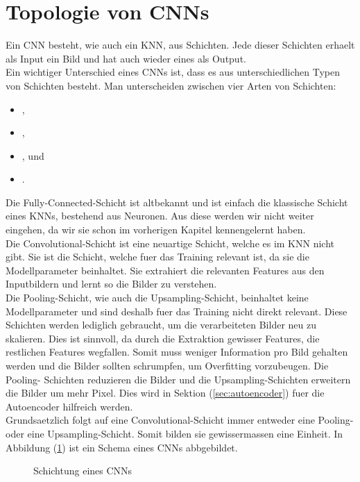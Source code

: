 \section{Topologie von CNNs}
Ein CNN besteht, wie auch ein KNN, aus Schichten. Jede dieser Schichten erhaelt
als Input ein Bild und hat auch wieder eines als Output. \\
Ein wichtiger Unterschied eines CNNs ist, dass es aus unterschiedlichen Typen von
Schichten besteht. Man unterscheiden zwischen vier Arten von Schichten:
\begin{itemize}
\item{,}
\item{,}
\item{, und}
\item{.}
\end{itemize}
Die Fully-Connected-Schicht ist altbekannt und ist einfach die klassische Schicht
eines KNNs, bestehend aus Neuronen. Aus diese werden wir nicht weiter eingehen,
da wir sie schon im vorherigen Kapitel kennengelernt haben. \\
Die Convolutional-Schicht ist eine neuartige Schicht, welche es im KNN nicht
gibt. Sie ist die Schicht, welche fuer das Training relevant ist,
da sie die Modellparameter beinhaltet. Sie extrahiert die relevanten Features
aus den Inputbildern und lernt so die Bilder zu verstehen. \\
Die Pooling-Schicht, wie auch die Upsampling-Schicht, beinhaltet keine
Modellparameter und sind deshalb fuer das Training nicht direkt relevant.
Diese Schichten werden lediglich gebraucht, um die verarbeiteten Bilder neu zu
skalieren. Dies ist sinnvoll, da durch die Extraktion gewisser Features, die
restlichen Features wegfallen. Somit muss weniger Information pro Bild gehalten
werden und die Bilder sollten schrumpfen, um Overfitting vorzubeugen. Die Pooling-
Schichten reduzieren die Bilder und die Upsampling-Schichten erweitern die
Bilder um mehr Pixel. Dies wird in Sektion (\ref{sec:autoencoder}) fuer die Autoencoder
hilfreich werden. \\
Grundsaetzlich folgt auf eine Convolutional-Schicht immer entweder eine Pooling-
oder eine Upsampling-Schicht. Somit bilden sie gewissermassen eine Einheit.
\para{}
In Abbildung (\ref{fig:cnn_topology}) ist ein Schema eines CNNs abbgebildet.
\begin{figure}[h!]

  \caption{Schichtung eines CNNs}
  \label{fig:cnn_topology}
\end{figure}

